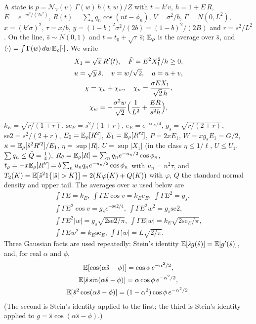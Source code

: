 A state is $p=\mathcal N_V(v)\,\Gamma(w)\,h(t,w)/Z$ with $t=k'v$, $h=1+E\,R$, $E=e^{-w^2/(2s^2)}$, $R(t)=\sum_nq_n\cos(nt-\phi_n)$, $V=\sigma^2/b$, $\Gamma=N(0,L^2)$, $x=(k'\sigma)^2$, $\tau=x/b$, $y=(1-b)^2\sigma^2/(2b)=(1-b)^2/(2B)$ and $r=s^2/L^2$.
On the line, $\hat s\sim N(0,1)$ and $t=t_0+\sqrt\tau\,\hat s$; $\mathbb{E}_\rho$ is the average over $\hat s$, and $\langle\cdot\rangle=\int\Gamma(w)\,dw\,\mathbb{E}_\rho[\cdot]$.
We write
\begin{gather}
X_1=\sqrt x\,R'(t),\quad \tilde F=E^2X_1^2/h\ge0,\nonumber\\ u=\sqrt y\,\hat s,\quad v=w/\sqrt2,\quad a=u+v,\nonumber\\
\chi=\chi_v+\chi_w,\quad \chi_v=\frac{\sigma EX_1}{\sqrt2\,h},\nonumber\\ \chi_w=-\frac{\sigma^2w}{\sqrt2}\Bigl(\frac1{L^2}+\frac{ER}{s^2h}\Bigr),
\end{gather}
$k_E=\sqrt{r/(1+r)}$, $\mathrm{se}_E=s^2/(1+r)$, $e_E=e^{-\mathrm{se}_E/4}$, $g_s=\sqrt{r/(2+r)}$, $\mathrm{se2}=s^2/(2+r)$, $E_0=\mathbb{E}_\rho[R^2]$, $E_1=\mathbb{E}_\rho[R'^2]$, $P=2xE_1$, $W=xg_sE_1=G/2$, $\kappa=\mathbb{E}_\rho[\hat s^2R'^2]/E_1$, $\eta=\sup|R|$, $U=\sup|X_1|$ (in the class $\eta\le1/\ell$, $U\le U_1$, $\sum q_n\le\bar Q=\tfrac14$), $R_\theta=\mathbb{E}_\rho[R]=\sum_nq_ne^{-u_n/2}\cos\phi_n$, $t_\rho=-x\mathbb{E}_\rho[R'']=b\sum_nu_nq_ne^{-u_n/2}\cos\phi_n$ with $u_n=n^2\tau$, and $T_2(K)=\E[\hat s^21\{|\hat s|>K\}]=2(K\varphi(K)+Q(K))$ with $\varphi$, $Q$ the standard normal density and upper tail.
The averages over $w$ used below are
\begin{gather}
\textstyle\int\Gamma E=k_E,\ \int\Gamma E\cos v=k_Ee_E,\ \int\Gamma E^2=g_s,\nonumber\\
\textstyle\int\Gamma E^2\cos v=g_se^{-\mathrm{se2}/4},\ \int\Gamma E^2w^2=g_s\mathrm{se2},\nonumber\\
\textstyle\int\Gamma E^2|w|=g_s\sqrt{2\mathrm{se2}/\pi},\ \int\Gamma E|w|=k_E\sqrt{2\mathrm{se}_E/\pi},\nonumber\\
\textstyle\int\Gamma Ew^2=k_E\mathrm{se}_E,\ \int\Gamma|w|=L\sqrt{2/\pi}.
\end{gather}
Three Gaussian facts are used repeatedly: Stein's identity $\mathbb{E}[\hat sg(\hat s)]=\mathbb{E}[g'(\hat s)]$, and, for real $\alpha$ and $\phi$,
\begin{gather}
\mathbb{E}[\cos(\alpha\hat s-\phi)]=\cos\phi\,e^{-\alpha^2/2},\nonumber\\ \mathbb{E}[\hat s\sin(\alpha\hat s-\phi)]=\alpha\cos\phi\,e^{-\alpha^2/2},\nonumber\\
\mathbb{E}[\hat s^2\cos(\alpha\hat s-\phi)]=(1-\alpha^2)\cos\phi\,e^{-\alpha^2/2}.
\label{eq:gauss3}
\end{gather}
(The second is Stein's identity applied to the first; the third is Stein's identity applied to $g=\hat s\cos(\alpha\hat s-\phi)$.)

